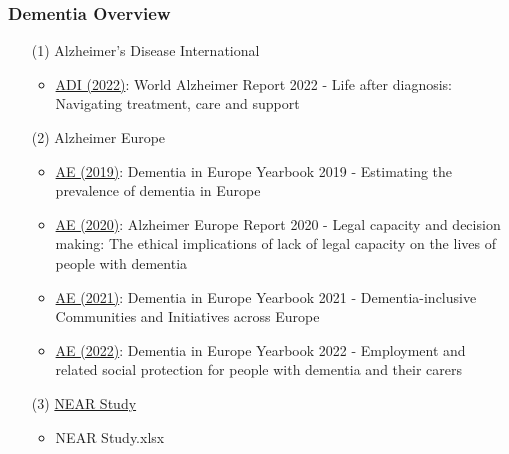 \documentclass[12pt]{article}
\begin{document}
\subsubsection{Dementia Overview}
\begin{itemize}
    \item[(1)] Alzheimer's Disease International
    \begin{itemize}
        \item \href{https://www.alzint.org/resource/world-alzheimer-report-2022/}{ADI (2022)}: World Alzheimer Report 2022 - Life after diagnosis: Navigating treatment, care and support
    \end{itemize}
    \item[(2)] Alzheimer Europe
    \begin{itemize}
        \item \href{https://www.alzheimer-europe.org/resources/publications/dementia-europe-yearbook-2019-estimating-prevalence-dementia-europe}{AE (2019)}: Dementia in Europe Yearbook 2019 - Estimating the prevalence of dementia in Europe
        \item \href{https://www.alzheimer-europe.org/resources/publications/2020-alzheimer-europe-report-legal-capacity-and-decision-making-ethical}{AE (2020)}: Alzheimer Europe Report 2020 - Legal capacity and decision making: The ethical implications of lack of legal capacity on the lives of people with dementia
        \item \href{https://www.alzheimer-europe.org/reports-publication/dementia-europe-yearbook-2021-dementia-inclusive-communities}{AE (2021)}: Dementia in Europe Yearbook 2021 - Dementia-inclusive Communities and Initiatives across Europe
        \item \href{https://www.alzheimer-europe.org/product/dementia-europe-yearbook-2022-employment-and-related-social-protection-people-dementia-and}{AE (2022)}: Dementia in Europe Yearbook 2022 - Employment and related social protection for people with dementia and their carers
    \end{itemize}
    \item[(3)] \href{https://www.near-aging.se/databases/}{NEAR Study}
    \begin{itemize}
        \item NEAR Study.xlsx
    \end{itemize}
\end{itemize}
\end{document}
